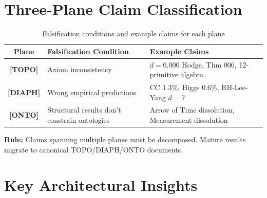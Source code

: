 \documentclass[11pt,a4paper]{article}
\begin{document}
\section{Three-Plane Claim Classification}

\begin{table}[h!]
\centering
\caption{Falsification conditions and example claims for each plane}
\label{tab:planes}
\begin{tabular}{c l l}
\toprule
\textbf{Plane} & \textbf{Falsification Condition} & \textbf{Example Claims} \\
\midrule
\textbf{[TOPO]} & Axiom inconsistency & $d{=}0.000$ Hodge, Thm 006, 12-primitive algebra \\
\textbf{[DIAPH]} & Wrong empirical predictions & CC 1.3\%, Higgs 0.6\%, RH-Lee-Yang $d{=}7$ \\
\textbf{[ONTO]} & Structural results don't constrain ontologies & Arrow of Time dissolution, Measurement dissolution \\
\bottomrule
\end{tabular}
\end{table}

\noindent \textbf{Rule:} Claims spanning multiple planes must be decomposed. Mature results migrate to canonical TOPO/DIAPH/ONTO documents.

\section{Key Architectural Insights}
\end{document}
